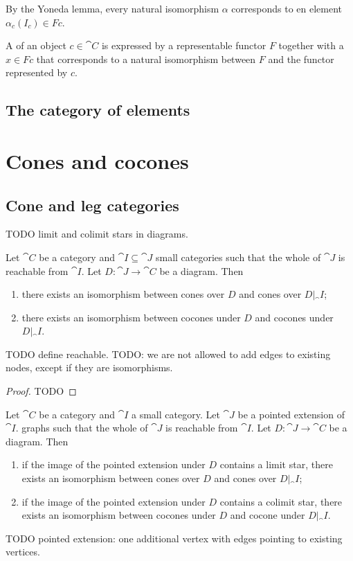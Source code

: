 By the Yoneda lemma, every natural isomorphism $\alpha$ corresponds to en element $\alpha_c(I_c) \in Fc$.
\begin{definition}
A  of an object $c\in \cat{C}$ is expressed by a representable functor $F$ together with a  $x\in Fc$ that corresponds to a natural isomorphism between $F$ and the functor represented by $c$.
\end{definition}
\section{The category of elements}
\chapter{Cones and cocones}

\section{Cone and leg categories}
TODO limit and colimit stars in diagrams.

\begin{proposition} \label{walkingConesCocones}
Let $\cat{C}$ be a category and $\cat{I}\subseteq \cat{J}$ small categories such that the whole of $\cat{J}$ is reachable from $\cat{I}$. Let $D: \cat{J}\to \cat{C}$ be a diagram. Then
\begin{enumerate}
\item there exists an isomorphism between cones over $D$ and cones over $D|_\cat{I}$;
\item there exists an isomorphism between cocones under $D$ and cocones under $D|_\cat{I}$.
\end{enumerate}
\end{proposition}
TODO define reachable. TODO: we are not allowed to add edges to existing nodes, except if they are isomorphisms.
\begin{proof}
TODO
\end{proof}

\begin{proposition} \label{limitExtensionConesCocones}
Let $\cat{C}$ be a category and $\cat{I}$ a small category. Let $\cat{J}$ be a pointed extension of $\cat{I}$. graphs such that the whole of $\cat{J}$ is reachable from $\cat{I}$. Let $D: \cat{J}\to \cat{C}$ be a diagram. Then
\begin{enumerate}
\item if the image of the pointed extension under $D$ contains a limit star, there exists an isomorphism between cones over $D$ and cones over $D|_\cat{I}$;
\item if the image of the pointed extension under $D$ contains a colimit star, there exists an isomorphism between cocones under $D$ and cocone under $D|_\cat{I}$.
\end{enumerate}
\end{proposition}
TODO pointed extension: one additional vertex with edges pointing to existing vertices.

